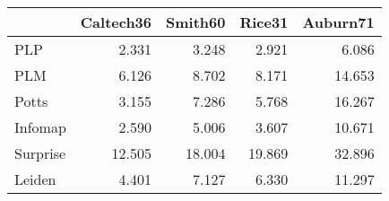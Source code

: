 \begin{tabular}{lrrrr}
\toprule
{} & Caltech36 & Smith60 & Rice31 & Auburn71 \\
\midrule
PLP      &     2.331 &   3.248 &  2.921 &    6.086 \\
PLM      &     6.126 &   8.702 &  8.171 &   14.653 \\
Potts    &     3.155 &   7.286 &  5.768 &   16.267 \\
Infomap  &     2.590 &   5.006 &  3.607 &   10.671 \\
Surprise &    12.505 &  18.004 & 19.869 &   32.896 \\
Leiden   &     4.401 &   7.127 &  6.330 &   11.297 \\
\bottomrule
\end{tabular}
